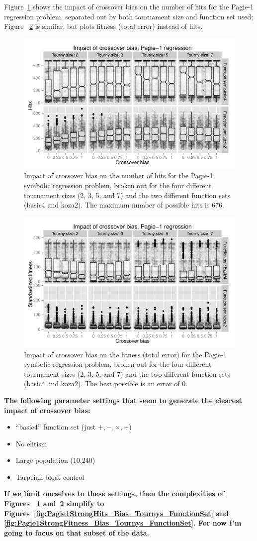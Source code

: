 \documentclass{sig-alternate}
\begin{document}
Figure~\ref{fig:Pagie1Hits_Bias_Tournys_FunctionSet} shows the impact of crossover bias on the number of hits for 
the Pagie-1 regression problem, separated out by both tournament size and function set used; Figure~
\ref{fig:Pagie1Fitness_Bias_Tournys_FunctionSet} is similar, but plots fitness (total error) instead of hits.

\begin{figure}
\centering
\includegraphics[width=0.45 \textwidth]{Plots/Pagie_1_Hits_vs_Bias_Tournys_FunctionSet.pdf}
\caption{Impact of crossover bias on the number of hits for the Pagie-1 symbolic regression problem, broken out for 
the four different tournament sizes (2, 3, 5, and 7) and the two different function sets (basic4 and koza2). The 
maximum number of possible hits is 676.}
\label{fig:Pagie1Hits_Bias_Tournys_FunctionSet}
\end{figure}

\begin{figure}
\centering
\includegraphics[width=0.45 \textwidth]{Plots/Pagie_1_Fitness_vs_Bias_Tournys_FunctionSet.pdf}
\caption{Impact of crossover bias on the fitness (total error) for the Pagie-1 symbolic regression problem, broken out 
for the four different tournament sizes (2, 3, 5, and 7) and the two different function sets (basic4 and koza2). The best 
possible is an error of 0.}
\label{fig:Pagie1Fitness_Bias_Tournys_FunctionSet}
\end{figure}

\textbf{The following parameter settings that seem to generate the clearest impact of crossover bias:}
\begin{itemize}
	\item ``basic4'' function set (just $+, -, \times, \div$)
	\item No elitism
	\item Large population (10,240)
	\item Tarpeian bloat control
\end{itemize}
\textbf{If we limit ourselves to these settings, then the complexities of Figures~
\ref{fig:Pagie1Hits_Bias_Tournys_FunctionSet} and~\ref{fig:Pagie1Fitness_Bias_Tournys_FunctionSet} simplify to 
Figures~\ref{fig:Pagie1StrongHits_Bias_Tournys_FunctionSet} and~
\ref{fig:Pagie1StrongFitness_Bias_Tournys_FunctionSet}. For now I'm going to focus on that subset of the data.}
\end{document}
